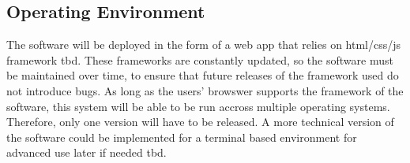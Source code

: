 \documentclass{article}
\newcommand{\comment}[1]{}
\begin{document}
\subsection{Operating Environment}
\comment{
Describe the enviroment in which the software will operate, including the hardware platform, operating systems and versions, and any other software components or applications with which it must peacefully coexist.
	}
The software will be deployed in the form of a web app that relies on \acrshort{html}/\acrshort{css}/\acrshort{js} framework \acrfull{tbd}. These frameworks are constantly updated, so the software must be maintained over time, to ensure that future releases of the framework used do not introduce bugs. As long as the users' browswer supports the framework of the software, this system will be able to be run accross multiple operating systems. Therefore, only one version will have to be released. A more technical version of the software could be implemented for a terminal based environment for advanced use later if needed \acrshort{tbd}.
\end{document}
